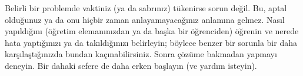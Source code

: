 \documentclass[../../../include/open-logic-section]{subfiles}
\begin{document}
Belirli bir problemde vaktiniz (ya da sabrınız) tükenirse sorun değil.
Bu, aptal olduğunuz ya da onu hiçbir zaman anlayamayacağınız anlamına
gelmez. Nasıl yapıldığını (öğretim elemanınızdan ya da başka bir
öğrenciden) öğrenin ve nerede hata yaptığınızı ya da takıldığınızı
belirleyin; böylece benzer bir sorunla bir daha karşılaştığınızda bundan
kaçınabilirsiniz. Sonra çözüme bakmadan yapmayı deneyin. Bir dahaki
sefere de daha erken başlayın (ve yardım isteyin).
\end{document}
